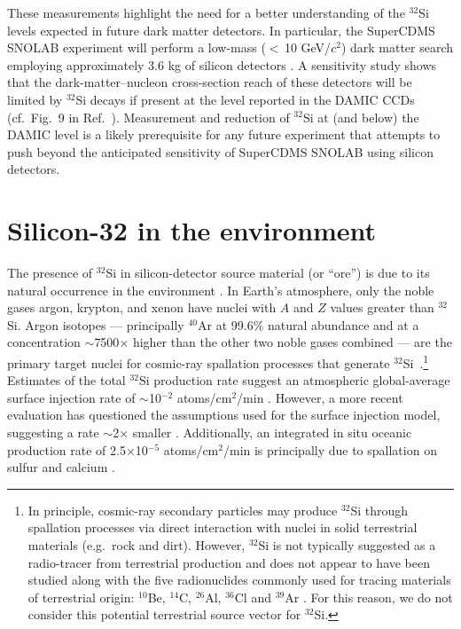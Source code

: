 \documentclass[final,5p]{elsarticle}
\def\si{$^{32}$Si\xspace}
\begin{document}
These measurements highlight the need for a better understanding of the \si levels expected in future dark matter detectors. In particular, the SuperCDMS SNOLAB experiment will perform a low-mass ($<$\,10 GeV/$c^2$) dark matter search employing approximately 3.6 kg of silicon detectors \cite{sensitivity}. A sensitivity study shows that the dark-matter--nucleon cross-section reach of these detectors will be limited by \si decays if present at the level reported in the DAMIC CCDs (cf.\ Fig.\ 9 in Ref.\ \cite{sensitivity}). Measurement and reduction of \si at (and below) the DAMIC level is a likely prerequisite for any future experiment that attempts to push beyond the anticipated sensitivity of SuperCDMS SNOLAB using silicon detectors.

\section{Silicon-32 in the environment}\label{sec:environment}
The presence of \si in silicon-detector source material (or ``ore'') is due to its natural occurrence in the environment \cite{lal}. In Earth's atmosphere, only the noble gases argon, krypton, and xenon have nuclei with $A$ and $Z$ values greater than \si. Argon isotopes --- principally $^{40}$Ar at 99.6\% natural abundance and at a concentration $\sim$7500$\times$ higher than the other two noble gases combined --- are the primary target nuclei for cosmic-ray spallation processes that generate \si\ \cite{lal2}.\footnote{In principle, cosmic-ray secondary particles may produce \si through spallation processes via direct interaction with nuclei in solid terrestrial materials  (e.g.\ rock and dirt). However, \si is not typically suggested as a radio-tracer from terrestrial production and does not appear to have been studied along with the five radionuclides commonly used for tracing materials of terrestrial origin: $^{10}$Be, $^{14}$C, $^{26}$Al, $^{36}$Cl and $^{39}$Ar \cite{lal5, gosse}. For this reason, we do not consider this potential terrestrial source vector for \si.} Estimates of the total \si production rate suggest an atmospheric global-average surface injection rate of $\sim$10$^{-2}$ atoms/cm$^2$/min \cite{lal3}.  However, a more recent evaluation has questioned the assumptions used for the surface injection model, suggesting a rate $\sim$2$\times$ smaller \cite{paradox}. Additionally, an integrated in situ oceanic production rate of 2.5$\times$10$^{-5}$ atoms/cm$^{2}$/min is principally due to spallation on sulfur and calcium \cite{lal4}.
\end{document}
